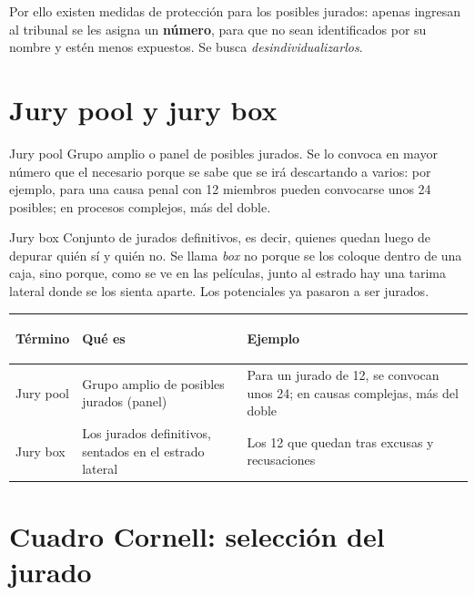 \documentclass[12pt,oneside]{book}
\begin{document}
Por ello existen medidas de protección para los posibles jurados: apenas ingresan al tribunal se les asigna un \textbf{número}, para que no sean identificados por su nombre y estén menos expuestos. Se busca \textit{desindividualizarlos}.

\section{Jury pool y jury box}

\begin{definition}{Jury pool}
Grupo amplio o panel de posibles jurados. Se lo convoca en mayor número que el necesario porque se sabe que se irá descartando a varios: por ejemplo, para una causa penal con 12 miembros pueden convocarse unos 24 posibles; en procesos complejos, más del doble.
\end{definition}

\begin{definition}{Jury box}
Conjunto de jurados definitivos, es decir, quienes quedan luego de depurar quién sí y quién no. Se llama \textit{box} no porque se los coloque dentro de una caja, sino porque, como se ve en las películas, junto al estrado hay una tarima lateral donde se los sienta aparte. Los potenciales ya pasaron a ser jurados.
\end{definition}

\begin{table}[H]
\centering
\small
\renewcommand{\arraystretch}{1.25}
\begin{tabularx}{\textwidth}{@{}>{\bfseries\raggedright\arraybackslash}p{}YY@{}}
\toprule
Término & Qué es & Ejemplo \\
\midrule
Jury pool & Grupo amplio de posibles jurados (panel) & Para un jurado de 12, se convocan unos 24; en causas complejas, más del doble \\
Jury box & Los jurados definitivos, sentados en el estrado lateral & Los 12 que quedan tras excusas y recusaciones \\
\bottomrule
\end{tabularx}
\end{table}

\section{Cuadro Cornell: selección del jurado}
\end{document}
